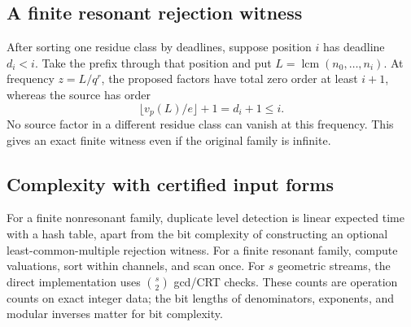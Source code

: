 \documentclass[11pt,letterpaper]{article}
\theoremstyle{definition}
\theoremstyle{remark}
\newcommand{\lcm}{\operatorname{lcm}}
\numberwithin{equation}{section}
\begin{document}
\subsection{A finite resonant rejection witness}
After sorting one residue class by deadlines, suppose position $i$ has deadline $d_i<i$. Take the prefix through that position and put $L=\lcm(n_0,\ldots,n_i)$. At frequency $z=L/q^r$, the proposed factors have total zero order at least $i+1$, whereas the source has order
\[
 \lfloor v_p(L)/e\rfloor+1=d_i+1\le i.
\]
No source factor in a different residue class can vanish at this frequency. This gives an exact finite witness even if the original family is infinite.

\subsection{Complexity with certified input forms}
For a finite nonresonant family, duplicate level detection is linear expected time with a hash table, apart from the bit complexity of constructing an optional least-common-multiple rejection witness. For a finite resonant family, compute valuations, sort within channels, and scan once. For $s$ geometric streams, the direct implementation uses $\binom{s}{2}$ gcd/CRT checks. These counts are operation counts on exact integer data; the bit lengths of denominators, exponents, and modular inverses matter for bit complexity.
\end{document}
